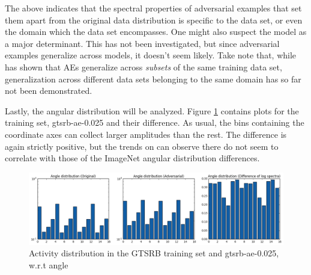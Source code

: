 \documentclass[11pt, a4paper]{article}
\begin{document}
The above indicates that the spectral properties of adversarial examples that set them apart from the original data distribution is specific to the data set, or even the domain which the data set encompasses. One might also suspect the model as a major determinant. This has not been investigated, but since adversarial examples generalize across models, it doesn't seem likely. Take note that, while \cite{intriguing-properties-of-neural-networks} has shown that AEs generalize across \emph{subsets} of the same training data set, generalization across different data sets belonging to the same domain has so far not been demonstrated.

Lastly, the angular distribution will be analyzed. Figure \ref{fig:gtsrb-ae-0.025-angle} contains plots for the training set, gtsrb-ae-0.025 and their difference. As usual, the bins containing the coordinate axes can collect larger amplitudes than the rest. The difference is again strictly positive, but the trends on can observe there do not seem to correlate with those of the ImageNet angular distribution differences.

\begin{figure}[htb]
	\centering
	\includegraphics[width=\textwidth]{images/spectra/gtsrb-ae-0dot025-minconfidence-0dot5-maxorig-0-angle-16-bins.png}
	\caption{Activity distribution in the GTSRB training set and gtsrb-ae-0.025, w.r.t angle}
	\label{fig:gtsrb-ae-0.025-angle}
\end{figure}

\end{document}
